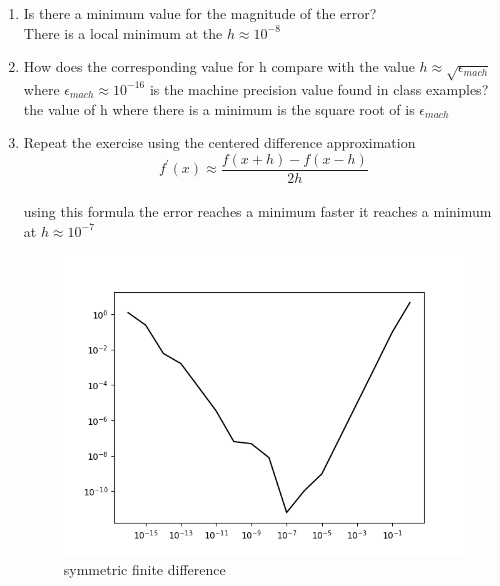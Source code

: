 \documentclass{article}
\begin{document}
\begin{enumerate}
    \begin{enumerate}
        \item Is there a minimum value for the magnitude of the error?
        \\ There is a local minimum at the $ h \approx 10^{-8} $
        \item How does the corresponding value for h compare with the value $ h \approx \sqrt{\epsilon_{mach}}$ where $\epsilon_{mach} \approx 10^{-16}$ is the machine precision value found in class examples? \\
        the value of h where there is a minimum is the square root of is $\epsilon_{mach}$
        \item Repeat the exercise using the centered difference approximation
        $$ f^{\prime}(x) \approx \frac{f(x+h)-f(x-h)}{2h}$$
        \\ using this formula the error reaches a minimum faster it reaches  a minimum at $ h \approx 10^{-7} $
        \begin{figure}[hbt!]
        \centering
        \includegraphics[width=1\linewidth]{finite_diff2png.png}
        \caption{ symmetric finite difference}
        \label{fig: symmetric finite diffrence}
        
    \end{figure}
    \end{enumerate}

\end{enumerate}
\end{document}
